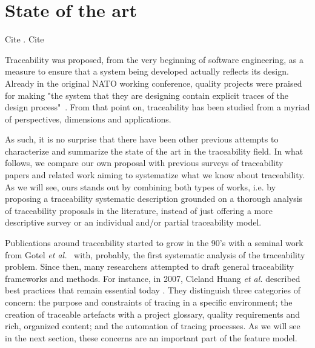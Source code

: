 \section{State of the art} \label{sec:soa}

Cite \cite{lindval1996-practical-implications-of-traceability}.
Cite \cite{lin2021-traceability-IR-BERT-models,hotlmann2020-MB-traceability-terminology}


Traceability was proposed, from the very beginning of software engineering, as a measure to ensure that a system being developed actually reflects its design. Already in the original NATO working conference, quality projects were praised for making "the system that they are designing contain explicit traces of
the design process"~\cite{randel68-nato-system-design}. From that point on, traceability has been studied from a myriad of perspectives, dimensions and applications. 

As such, it is no surprise that there have been other previous attempts to characterize and summarize the state of the art in the traceability field. In what follows, we compare our own proposal with previous surveys of traceability papers and related work aiming to systematize what we know about traceability. As we will see, ours stands out by combining both types of works, i.e. by proposing a traceability systematic description grounded on a thorough analysis of traceability proposals in the literature, instead of just offering a more descriptive survey or an individual and/or partial traceability model.

Publications around traceability started to grow in the 90's with a seminal work from Gotel \textit{et al.}~\cite{gotel1994} with, probably, the first systematic analysis of the traceability problem.  %
Since then, many researchers attempted to draft general traceability frameworks and methods. For instance, in 2007, Cleland Huang \textit{et al.} described best practices that remain essential today \cite{clelandhuang2007bestPracticeForAutomatedTraceability}. They distinguish three categories of concern: the purpose and constraints of tracing in a specific environment; the creation of traceable artefacts with a project glossary, quality requirements and rich, organized content; and the automation of tracing processes. As we will see in the next section, these concerns are an important part of the feature model.


